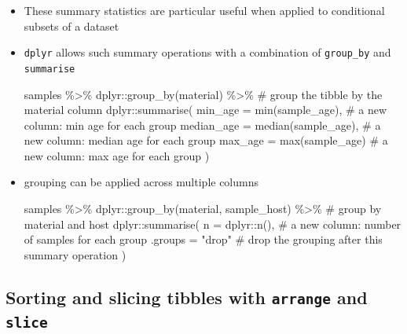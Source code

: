 \documentclass[
  letterpaper,
]{book}
\newenvironment{Shaded}{}{}
\newcommand{\AttributeTok}[1]{\textcolor[rgb]{0.84,0.23,0.29}{#1}}
\newcommand{\CommentTok}[1]{\textcolor[rgb]{0.42,0.45,0.49}{#1}}
\newcommand{\FunctionTok}[1]{\textcolor[rgb]{0.44,0.26,0.76}{#1}}
\newcommand{\NormalTok}[1]{\textcolor[rgb]{0.14,0.16,0.18}{#1}}
\newcommand{\SpecialCharTok}[1]{\textcolor[rgb]{0.00,0.36,0.77}{#1}}
\newcommand{\StringTok}[1]{\textcolor[rgb]{0.01,0.18,0.38}{#1}}
\begin{document}
\begin{itemize}
\item
  These summary statistics are particular useful when applied to
  conditional subsets of a dataset
\item
  \texttt{dplyr} allows such summary operations with a combination of
  \texttt{group\_by} and \texttt{summarise}

\begin{Shaded}
\begin{Highlighting}[]
\NormalTok{samples }\SpecialCharTok{\%\textgreater{}\%}
\NormalTok{dplyr}\SpecialCharTok{::}\FunctionTok{group\_by}\NormalTok{(material) }\SpecialCharTok{\%\textgreater{}\%}  \CommentTok{\# group the tibble by the material column}
\NormalTok{dplyr}\SpecialCharTok{::}\FunctionTok{summarise}\NormalTok{(}
    \AttributeTok{min\_age =} \FunctionTok{min}\NormalTok{(sample\_age),   }\CommentTok{\# a new column: min age for each group}
    \AttributeTok{median\_age =} \FunctionTok{median}\NormalTok{(sample\_age), }\CommentTok{\# a new column: median age for each group}
    \AttributeTok{max\_age =} \FunctionTok{max}\NormalTok{(sample\_age)    }\CommentTok{\# a new column: max age for each group}
\NormalTok{)}
\end{Highlighting}
\end{Shaded}
\item
  grouping can be applied across multiple columns

\begin{Shaded}
\begin{Highlighting}[]
\NormalTok{samples }\SpecialCharTok{\%\textgreater{}\%}
\NormalTok{dplyr}\SpecialCharTok{::}\FunctionTok{group\_by}\NormalTok{(material, sample\_host) }\SpecialCharTok{\%\textgreater{}\%} \CommentTok{\# group by material and host}
\NormalTok{dplyr}\SpecialCharTok{::}\FunctionTok{summarise}\NormalTok{(}
    \AttributeTok{n =}\NormalTok{ dplyr}\SpecialCharTok{::}\FunctionTok{n}\NormalTok{(),  }\CommentTok{\# a new column: number of samples for each group}
    \AttributeTok{.groups =} \StringTok{"drop"} \CommentTok{\# drop the grouping after this summary operation}
\NormalTok{)}
\end{Highlighting}
\end{Shaded}
\end{itemize}

\hypertarget{sorting-and-slicing-tibbles-with-arrange-and-slice}{%
\subsection{\texorpdfstring{Sorting and slicing tibbles with
\texttt{arrange} and
\texttt{slice}}{Sorting and slicing tibbles with arrange and slice}}\label{sorting-and-slicing-tibbles-with-arrange-and-slice}}
\end{document}
